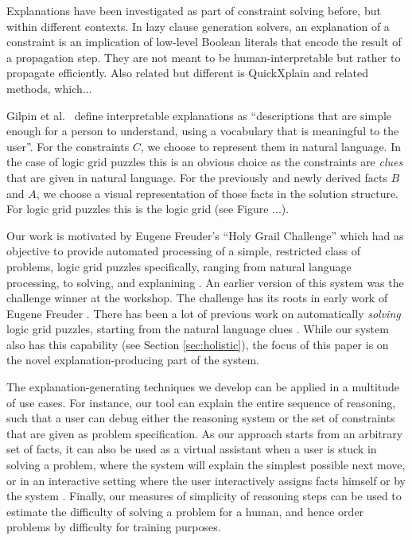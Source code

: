 Explanations have been investigated as part of constraint solving before, but within different contexts. In lazy clause generation solvers, an explanation of a constraint is an implication of low-level Boolean literals that encode the result of a propagation step. They are not meant to be human-interpretable but rather to propagate efficiently. Also related but different is QuickXplain and related methods, which...

Gilpin et al.~\cite{DBLP:conf/dsaa/GilpinBYBSK18} define interpretable explanations as ``descriptions that are simple enough for a person to understand, using a vocabulary that is meaningful to the user''. For the constraints $C$, we choose to represent them in natural language. In the case of logic grid puzzles this is an obvious choice as the constraints are \textit{clues} that are given in natural language. For the previously and newly derived facts $B$ and $A$, we choose a visual representation of those facts in the solution structure. For logic grid puzzles this is the logic grid (see Figure ...).

Our work is motivated by Eugene Freuder's ``Holy Grail Challenge'' which had as objective  to provide automated processing of a simple, restricted class of problems, logic grid puzzles specifically, ranging from natural language processing, to solving, and explanining \cite{}. 
An earlier version of this system was the challenge winner at the workshop. The challenge has its roots in early work of Eugene Freuder \cite{freuder1,freuder2}.
There has been a lot of previous work on automatically \emph{solving} logic grid puzzles, starting from the natural language clues \cite{related,work}. 
While our system also has this capability (see Section \ref{sec:holistic}), the focus of this paper is on the novel explanation-producing part of the system.

The explanation-generating techniques we develop can be applied in a multitude of use cases. 
For instance, our tool can explain the entire sequence of reasoning, such that a user can debug either the reasoning system or the set of constraints that are given as problem specification. 
As our approach starts from an arbitrary set of facts, it can also be used as a virtual assistant when a user is stuck in solving a problem, where the system will explain the simplest possible next move, or in an interactive setting where the user interactively assigns facts himself or by the system . 
Finally, our measures of simplicity of reasoning steps can be used to estimate the difficulty of solving a problem for a human, and hence order problems by difficulty for training purposes.


